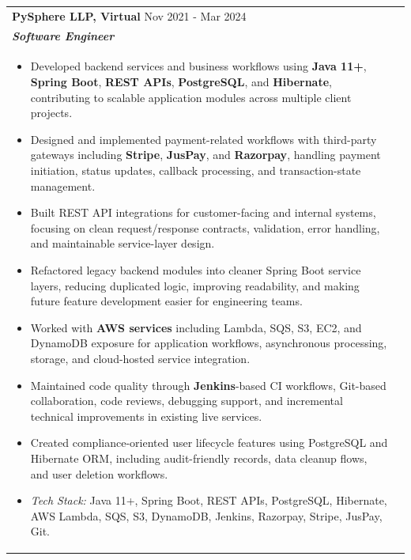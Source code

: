 \documentclass[a4paper,8pt]{article}
\begin{document}
\begin{tabularx}{\linewidth}{ @{}l r@{} }
\color[HTML]{1C033C} \textbf{PySphere LLP, Virtual} \hfill \color[HTML]{371e77} Nov 2021 - Mar 2024 \\[4pt]
\color[HTML]{371e77}\textbf{\textit{Software Engineer}} \hfill \color[HTML]{4B28A4} \\[5pt]
\begin{minipage}[t]{\linewidth}
    \begin{itemize}[nosep,after=\strut, leftmargin=2em, itemsep=2pt]
        \item Developed backend services and business workflows using \textbf{Java 11+}, \textbf{Spring Boot}, \textbf{REST APIs}, \textbf{PostgreSQL}, and \textbf{Hibernate}, contributing to scalable application modules across multiple client projects.
        \item Designed and implemented payment-related workflows with third-party gateways including \textbf{Stripe}, \textbf{JusPay}, and \textbf{Razorpay}, handling payment initiation, status updates, callback processing, and transaction-state management.
        \item Built REST API integrations for customer-facing and internal systems, focusing on clean request/response contracts, validation, error handling, and maintainable service-layer design.
        \item Refactored legacy backend modules into cleaner Spring Boot service layers, reducing duplicated logic, improving readability, and making future feature development easier for engineering teams.
        \item Worked with \textbf{AWS services} including Lambda, SQS, S3, EC2, and DynamoDB exposure for application workflows, asynchronous processing, storage, and cloud-hosted service integration.
        \item Maintained code quality through \textbf{Jenkins}-based CI workflows, Git-based collaboration, code reviews, debugging support, and incremental technical improvements in existing live services.
        \item Created compliance-oriented user lifecycle features using PostgreSQL and Hibernate ORM, including audit-friendly records, data cleanup flows, and user deletion workflows.
        \item \textit{Tech Stack:} Java 11+, Spring Boot, REST APIs, PostgreSQL, Hibernate, AWS Lambda, SQS, S3, DynamoDB, Jenkins, Razorpay, Stripe, JusPay, Git.
    \end{itemize}
    \end{minipage}
\end{tabularx}\\[3pt]
\end{document}

